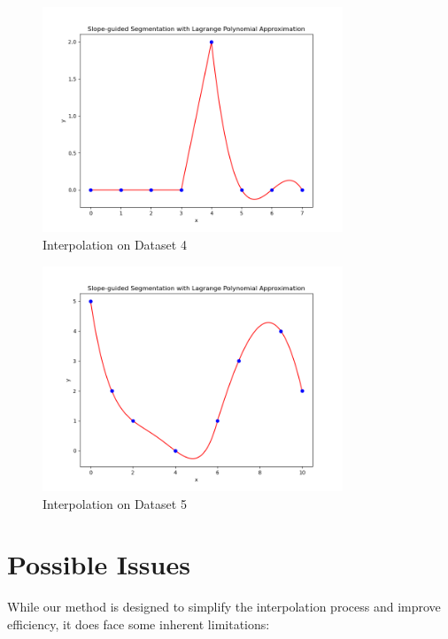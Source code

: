 \documentclass{article}
\begin{document}
\begin{figure}[htbp]
\centering
\includegraphics[width=0.8\textwidth]{test_case_4.png}
\caption{Interpolation on Dataset 4}
\end{figure}

\begin{figure}[htbp]
\centering
\includegraphics[width=0.8\textwidth]{test_case_5.png}
\caption{Interpolation on Dataset 5}
\end{figure}

\newpage
\section{Possible Issues}
While our method is designed to simplify the interpolation process and improve efficiency, it does face some inherent limitations:
\end{document}
